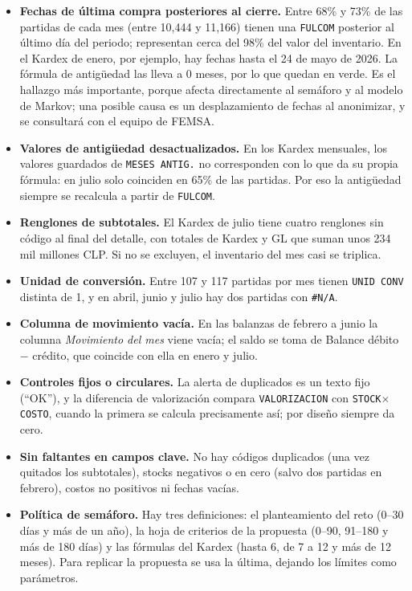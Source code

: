 \documentclass[11pt,letterpaper]{article}
\begin{document}
\begin{itemize}
  \item \textbf{Fechas de última compra posteriores al cierre.} Entre 68\% y 73\% de las partidas de cada mes (entre 10,444 y 11,166) tienen una \texttt{FULCOM} posterior al último día del periodo; representan cerca del 98\% del valor del inventario. En el Kardex de enero, por ejemplo, hay fechas hasta el 24 de mayo de 2026. La fórmula de antigüedad las lleva a 0 meses, por lo que quedan en verde. Es el hallazgo más importante, porque afecta directamente al semáforo y al modelo de Markov; una posible causa es un desplazamiento de fechas al anonimizar, y se consultará con el equipo de FEMSA.
  \item \textbf{Valores de antigüedad desactualizados.} En los Kardex mensuales, los valores guardados de \texttt{MESES ANTIG.} no corresponden con lo que da su propia fórmula: en julio solo coinciden en 65\% de las partidas. Por eso la antigüedad siempre se recalcula a partir de \texttt{FULCOM}.
  \item \textbf{Renglones de subtotales.} El Kardex de julio tiene cuatro renglones sin código al final del detalle, con totales de Kardex y GL que suman unos 234 mil millones CLP. Si no se excluyen, el inventario del mes casi se triplica.
  \item \textbf{Unidad de conversión.} Entre 107 y 117 partidas por mes tienen \texttt{UNID CONV} distinta de 1, y en abril, junio y julio hay dos partidas con \texttt{\#N/A}.
  \item \textbf{Columna de movimiento vacía.} En las balanzas de febrero a junio la columna \emph{Movimiento del mes} viene vacía; el saldo se toma de Balance débito $-$ crédito, que coincide con ella en enero y julio.
  \item \textbf{Controles fijos o circulares.} La alerta de duplicados es un texto fijo (``OK''), y la diferencia de valorización compara \texttt{VALORIZACION} con \texttt{STOCK}$\times$\texttt{COSTO}, cuando la primera se calcula precisamente así; por diseño siempre da cero.
  \item \textbf{Sin faltantes en campos clave.} No hay códigos duplicados (una vez quitados los subtotales), stocks negativos o en cero (salvo dos partidas en febrero), costos no positivos ni fechas vacías.
  \item \textbf{Política de semáforo.} Hay tres definiciones: el planteamiento del reto (0--30 días y más de un año), la hoja de criterios de la propuesta (0--90, 91--180 y más de 180 días) y las fórmulas del Kardex (hasta 6, de 7 a 12 y más de 12 meses). Para replicar la propuesta se usa la última, dejando los límites como parámetros.
\end{itemize}
\end{document}
